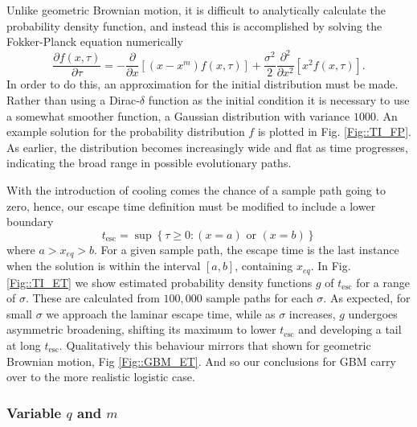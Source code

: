 \documentclass[useAMS]{mn2e}
\begin{document}
Unlike geometric Brownian motion, it is difficult to analytically
calculate 
the probability 
 density function, and instead this is accomplished
by solving the Fokker-Planck equation numerically
\begin{equation}
\frac{\partial f(x,\tau)}{\partial \tau}=-\frac{\partial}{\partial
  x}\left[\left(x-x^{m}\right) f(x,\tau)\right]+\frac{\sigma^{2}}{2}
\frac{\partial^2}{\partial x^{2}}\left[x^{2}f(x,\tau)\right].
\end{equation}
In order to do this, an approximation for the initial distribution
must be made. Rather than using a Dirac-$\delta$ function as the initial
condition it is necessary to use a somewhat smoother function, 
a Gaussian distribution with variance $1000$. 
An example solution for the probability distribution $f$ is plotted
 in Fig. \ref{Fig::TI_FP}. As earlier, the distribution becomes
 increasingly wide and flat as time progresses, indicating the broad
 range in possible evolutionary paths.
 
With the introduction of cooling comes the chance of a sample path
going to zero, hence, our escape time definition must be modified to include a lower boundary
\begin{equation}
t_{\text{esc}}=\sup\left\lbrace \tau\geq0:(x= a) \text{ or } (x=b)\right\rbrace
\end{equation}
where $a>x_{eq}>b$.
For a given sample path, the escape time is the last instance
when the solution is within the interval $[a,b]$, containing
$x_{eq}$. In Fig. \ref{Fig::TI_ET} we show estimated probability
density functions $g$ of $t_{\text{esc}}$ for a range of $\sigma$. These are
calculated from $100,000$ sample paths for each $\sigma$. As expected,
for small $\sigma$ we approach the laminar escape time, while as
$\sigma$ increases, $g$ undergoes asymmetric broadening,
shifting its maximum to
 lower $t_{\text{esc}}$ and developing a tail at long $t_{\text{esc}}$. Qualitatively
this behaviour mirrors that shown for
 geometric Brownian motion, Fig \ref{Fig::GBM_ET}. And so our
 conclusions for GBM carry over to the more realistic logistic case.
 
\subsubsection{Variable $q$ and $m$}
\end{document}
